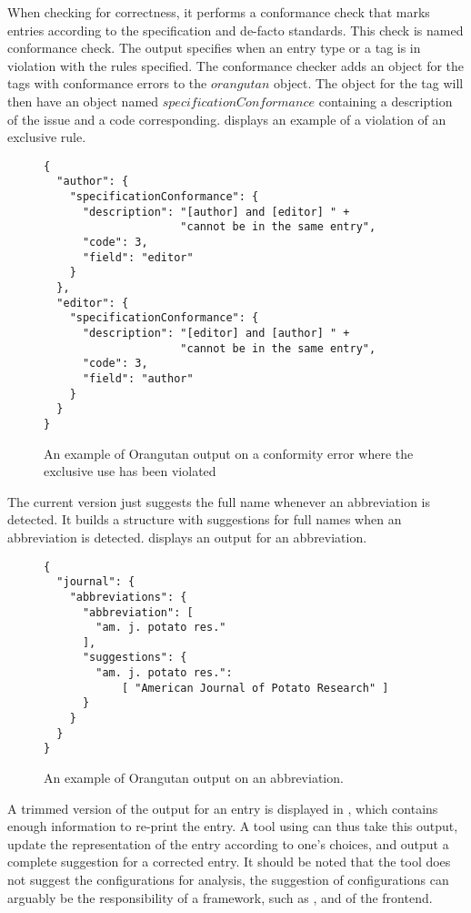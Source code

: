 
When checking for correctness, it performs a conformance check that
marks entries according to the {\bibtex} specification and de-facto
standards.  This check is named conformance check.  The output
specifies when an entry type or a tag is in violation with the rules
specified.  The conformance checker adds an object for the tags with
conformance errors to the $orangutan$ object.  The object for the tag
will then have an object named $specificationConformance$ containing a
description of the issue and a code corresponding.
 displays an example of a violation
of an exclusive rule.

\begin{figure}
  \centering
\begin{verbatim}
{
  "author": {
    "specificationConformance": {
      "description": "[author] and [editor] " +
                     "cannot be in the same entry",
      "code": 3,
      "field": "editor"
    }
  },
  "editor": {
    "specificationConformance": {
      "description": "[editor] and [author] " +
                     "cannot be in the same entry",
      "code": 3,
      "field": "author"
    }
  }
}
\end{verbatim}
\caption{An example of Orangutan output on a conformity error where
  the exclusive use has been violated}
\label{fig:orgazing_nonconformity}
\end{figure}

The current version just suggests the full name whenever an
abbreviation is detected.  It builds a structure with suggestions for
full names when an abbreviation is
detected.  displays an {\orangutan}
output for an abbreviation.

\begin{figure}
  \centering
\begin{verbatim}
{
  "journal": {
    "abbreviations": {
      "abbreviation": [
        "am. j. potato res."
      ],
      "suggestions": {
        "am. j. potato res.":
            [ "American Journal of Potato Research" ]
      }
    }
  }
}
\end{verbatim}
\caption{An example of Orangutan output on an abbreviation.}
\label{fig:orgazing_abbreviation}
\end{figure}

A trimmed version of the output for an entry is displayed in
, which contains enough information to
re-print the entry.  A tool using {\orangutan} can thus take this
output, update the representation of the entry according to one's
choices, and output a complete suggestion for a corrected entry.  It
should be noted that the tool does not suggest the configurations for
analysis, the suggestion of configurations can arguably be the
responsibility of a framework, such as {\orangutan}, and of the
frontend.

